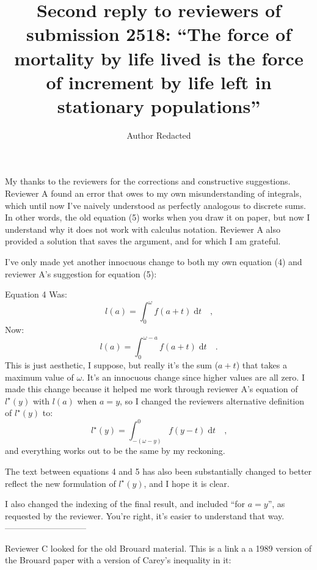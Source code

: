 \documentclass{article}
\newcommand{\dd}{\; \mathrm{d}}
\begin{document}
\title{Second reply to reviewers of submission 2518: ``The force of mortality by
life lived is the force of increment by life left in stationary populations''}
\author{Author Redacted}
\maketitle

My thanks to the reviewers for the corrections and constructive suggestions.
Reviewer A found an error that owes to my own misunderstanding of integrals,
which until now I've naively understood as perfectly analogous to discrete sums.
In other words, the old equation (5) works when you draw it on paper, but now I
understand why it does not work with calculus notation. Reviewer A also
provided a solution that saves the argument, and for which I am grateful.

I've only made yet another innocuous change to both my own equation (4) and
reviewer A's suggestion for equation (5):

Equation 4 Was:
\begin{equation}
\label{eq:la}
l(a) = \int _{0}^{\omega} f(a+t) \dd t \quad \text{,}
\end{equation}
Now:
\begin{equation}
\label{eq:la}
l(a) = \int _{0}^{\omega-a} f(a+t) \dd t \quad \text{.}
\end{equation}
This is just aesthetic, I suppose, but really it's the sum ($a+t$)
that takes a maximum value of $\omega$. It's an innocuous change since higher
values are all zero. I made this change because it helped me work through reviewer A's
equation of $l^\star (y)$ with $l(a)$ when $a=y$, so I changed the reviewers
alternative definition of $l^\star (y)$ to:
\begin{equation}
\label{eq:lstar}
l^\star (y) = \int _{-(\omega - y)}^0 f(y-t) \dd t \quad \text{,}
\end{equation}
and everything works out to be the same by my reckoning.

The text between equations 4 and 5 has also been substantially changed to
better reflect the new formulation of $l^\star (y)$, and I hope it is clear.

I also changed the indexing of the final result, and included ``for $a=y$'', as
requested by the reviewer. You're right, it's easier to understand that way.
-----------------------------

Reviewer C looked for the old Brouard material. This is a link a a 1989 version of the Brouard paper with a version of Carey's inequality in it:
\end{document}
